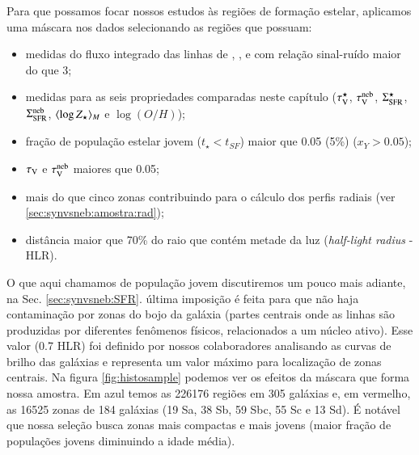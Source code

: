 Para que possamos focar nossos estudos às regiões de formação estelar, aplicamos uma máscara nos
dados selecionando as regiões que possuam:
\begin{itemize}
  \item medidas do fluxo integrado das linhas de \Hbeta, \oIII, \Halpha e \nII com relação
sinal-ruído maior do que 3;
  \item medidas para as seis propriedades comparadas neste capítulo ($\tau_{\mathrm{V}}^\star$, $\tau_{\mathrm{V}}^{\mathrm{neb}}$,
$\Sigma_{\mathrm{SFR}}^\star$, $\Sigma_{\mathrm{SFR}}^{\mathrm{neb}}$, $\meanM{\log Z_\star}$ e $\log(O/H)$);
  \item fração de população estelar jovem ($t_\star < t_{SF}$) maior que 0.05 (5\%) ($x_Y >0.05$);
  \item $\tau_{\mathrm{V}}$ e $\tau_{\mathrm{V}}^{\mathrm{neb}}$ maiores que 0.05;
  \item mais do que cinco zonas contribuindo para o cálculo dos perfis radiais (ver
  \ref{sec:synvsneb:amostra:rad});
  \item distância maior que 70\% do raio que contém metade da luz ({\em half-light radius} - HLR).
\end{itemize}
\noindent O que aqui chamamos de população jovem discutiremos um pouco mais adiante, na Sec.
\ref{sec:synvsneb:SFR}. última imposição é feita para que não haja contaminação por zonas
do bojo da galáxia (partes centrais onde as linhas são produzidas por diferentes fenômenos físicos,
relacionados a um núcleo ativo). Esse valor (0.7 HLR) foi definido por nossos colaboradores
analisando as curvas de brilho das galáxias e representa um valor máximo para localização de zonas
centrais. Na figura \ref{fig:histosample} podemos ver os efeitos da máscara que forma nossa
amostra. Em azul temos as 226176 regiões em 305 galáxias e, em vermelho, as 16525 zonas de 184
galáxias (19 Sa, 38 Sb, 59 Sbc, 55 Sc e 13 Sd). É notável que nossa seleção busca zonas mais compactas e
mais jovens (maior fração de populações jovens diminuindo a idade média). 
